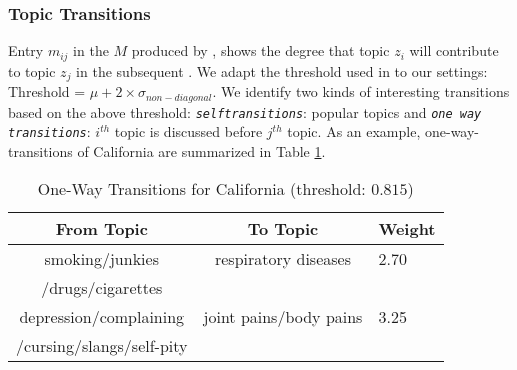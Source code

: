 \subsubsection{Topic Transitions}
Entry $m_{ij}$ in the \transition $M$ produced by
\tmatam, shows the degree that topic $z_i$ will contribute to topic $z_j$
in the subsequent \season.
We adapt the threshold used in \cite{DBLP:conf/kdd/WangAB12} to our settings: Threshold  = $\mu + 2\times\sigma_{non-diagonal}$.
We identify two kinds of interesting transitions based on the above threshold:
 \texttt{\emph{selftransitions}}: popular topics and \texttt{\emph{one way transitions}}: $i^{th}$ topic is discussed before $j^{th}$ topic.
As an example, one-way-transitions of California are summarized in Table \ref{tab:fulltransitionCalifornia}.
\begin{table}[t!]
\centering
\caption{One-Way Transitions for California (threshold: $0.815$)}
\label{tab:fulltransitionCalifornia}
{\small \begin{tabular}{|c|c|l|} \hline
 From Topic&To Topic&Weight\\ \hline
  smoking/junkies & respiratory diseases&  2.70\\ /drugs/cigarettes & & \\ \hline
  depression/complaining &  joint pains/body pains&  3.25\\ /cursing/slangs/self-pity & & \\
 \hline\end{tabular} 
}
\end{table}
